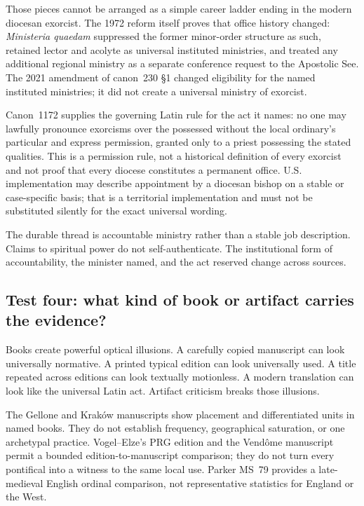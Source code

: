 Those pieces cannot be arranged as a simple career ladder ending in the
modern diocesan exorcist. The 1972 reform itself proves that office history
changed: \emph{Ministeria quaedam} suppressed the former minor-order structure
as such, retained lector and acolyte as universal instituted ministries, and
treated any additional regional ministry as a separate conference request to
the Apostolic See. The 2021 amendment of canon~230 §1 changed eligibility for
the named instituted ministries; it did not create a universal ministry of
exorcist.

Canon~1172 supplies the governing Latin rule for the act it names: no one may
lawfully pronounce exorcisms over the possessed without the local ordinary's
particular and express permission, granted only to a priest possessing the
stated qualities. This is a permission rule, not a historical definition of
every exorcist and not proof that every diocese constitutes a permanent
office. U.S. implementation may describe appointment by a diocesan bishop on
a stable or case-specific basis; that is a territorial implementation and
must not be substituted silently for the exact universal wording.

The durable thread is accountable ministry rather than a stable job
description. Claims to spiritual power do not self-authenticate. The
institutional form of accountability, the minister named, and the act reserved
change across sources.

\subsection{Test four: what kind of book or artifact carries the evidence?}

Books create powerful optical illusions. A carefully copied manuscript can
look universally normative. A printed typical edition can look universally
used. A title repeated across editions can look textually motionless. A modern
translation can look like the universal Latin act. Artifact criticism breaks
those illusions.

The Gellone and Kraków manuscripts show placement and differentiated units in
named books. They do not establish frequency, geographical saturation, or one
archetypal practice. Vogel--Elze's PRG edition and the Vendôme manuscript
permit a bounded edition-to-manuscript comparison; they do not turn every
pontifical into a witness to the same local use. Parker MS~79 provides a
late-medieval English ordinal comparison, not representative statistics for
England or the West.

